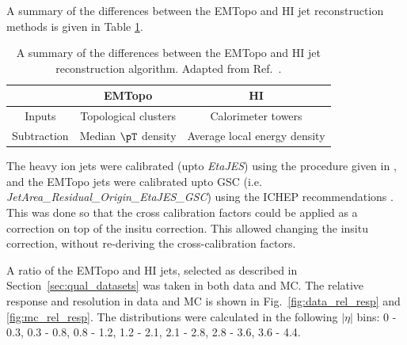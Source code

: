 

A summary of the differences between the EMTopo and HI jet reconstruction methods is given in Table \ref{table:algo_diff}.
\begin{table}[h]
\centering
\caption{A summary of the differences between the EMTopo and HI jet reconstruction algorithm. Adapted from Ref.~\cite{HIjesnote}.}
\begin{tabular}{|c|c|c|}
\hline
            & EMTopo                 & HI                           \\ \hline
Inputs      & Topological clusters   & Calorimeter towers           \\ \hline
Subtraction & Median $\pT$ density & Average local energy density \\ \hline
\end{tabular}
\label{table:algo_diff}
\end{table}




The heavy ion jets were calibrated (upto {\it EtaJES}) using the procedure given in \cite{HICalib}, and the EMTopo jets were calibrated upto GSC (i.e. {\it JetArea\_Residual\_Origin\_EtaJES\_GSC}) using the ICHEP recommendations \cite{CalibReco}. This was done so that the cross calibration factors could be applied as a correction on top of the insitu correction. This allowed changing the insitu correction, without re-deriving the cross-calibration factors. 

A ratio of the EMTopo and HI jets, selected as described in Section~\ref{sec:qual_datasets} was taken in both data and MC. The relative response and resolution in data and MC is shown in Fig.~\ref{fig:data_rel_resp} and \ref{fig:mc_rel_resp}. The distributions were calculated in the following $|\eta|$ bins: 0 - 0.3, 0.3 - 0.8, 0.8 - 1.2, 1.2 - 2.1, 2.1 - 2.8, 2.8 - 3.6, 3.6 - 4.4.

